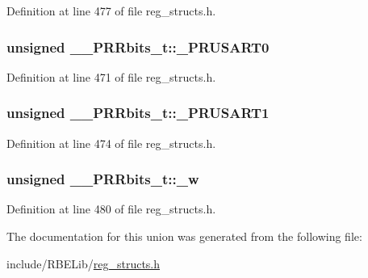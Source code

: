Definition at line 477 of file reg\+\_\+structs.\+h.

\hypertarget{union_____p_r_rbits__t_a315db837c5a5e2008c9319f62a437577}{
\subsubsection[{\+\_\+\+P\+R\+U\+S\+A\+R\+T0}]{\setlength{\rightskip}{0pt plus 5cm}unsigned \+\_\+\+\_\+\+P\+R\+Rbits\+\_\+t\+::\+\_\+\+P\+R\+U\+S\+A\+R\+T0}}\label{union_____p_r_rbits__t_a315db837c5a5e2008c9319f62a437577}


Definition at line 471 of file reg\+\_\+structs.\+h.

\hypertarget{union_____p_r_rbits__t_aa65141eec9122fa83bd614684c82fbd8}{
\subsubsection[{\+\_\+\+P\+R\+U\+S\+A\+R\+T1}]{\setlength{\rightskip}{0pt plus 5cm}unsigned \+\_\+\+\_\+\+P\+R\+Rbits\+\_\+t\+::\+\_\+\+P\+R\+U\+S\+A\+R\+T1}}\label{union_____p_r_rbits__t_aa65141eec9122fa83bd614684c82fbd8}


Definition at line 474 of file reg\+\_\+structs.\+h.

\hypertarget{union_____p_r_rbits__t_a1b8bc02cf5b812065bc29ecb697b5337}{
\subsubsection[{\+\_\+w}]{\setlength{\rightskip}{0pt plus 5cm}unsigned \+\_\+\+\_\+\+P\+R\+Rbits\+\_\+t\+::\+\_\+w}}\label{union_____p_r_rbits__t_a1b8bc02cf5b812065bc29ecb697b5337}


Definition at line 480 of file reg\+\_\+structs.\+h.



The documentation for this union was generated from the following file\+:\begin{DoxyCompactItemize}
\item 
include/\+R\+B\+E\+Lib/\hyperlink{reg__structs_8h}{reg\+\_\+structs.\+h}\end{DoxyCompactItemize}
